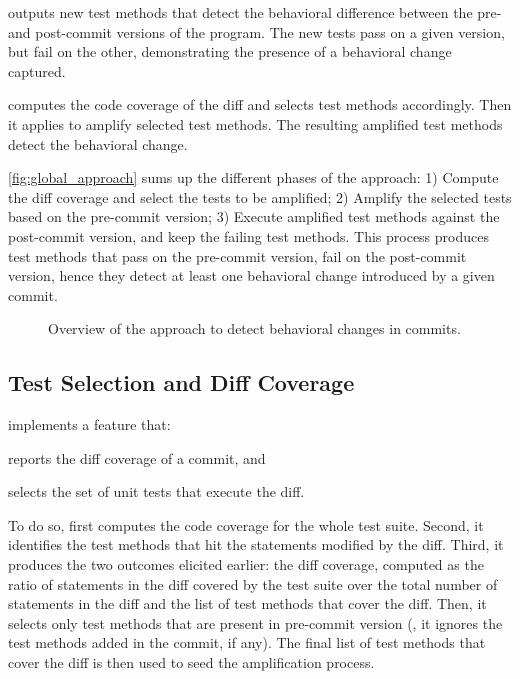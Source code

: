 \DCI outputs new test methods that detect the behavioral difference between the pre- and post-commit versions of the program.
The new tests pass on a given version, but fail on the other, demonstrating the presence of a behavioral change captured.

\DCI computes the code coverage of the diff and selects test methods accordingly.
Then it applies \dspot to amplify selected test methods.
The resulting amplified test methods detect the behavioral change.

\autoref{fig:global_approach} sums up the different phases of the approach:
1) Compute the diff coverage and select the tests to be amplified;
2) Amplify the selected tests based on the pre-commit version;
3) Execute amplified test methods against the post-commit version, and keep the failing test methods.
This process produces test methods that pass on the pre-commit version, fail on the post-commit version, hence they detect at least one behavioral change introduced by a given commit.

\begin{figure}
    \caption{Overview of the approach to detect behavioral changes in commits.}
	\label{fig:global_approach}
\end{figure}

\subsection{Test Selection and Diff Coverage}
\label{subsec:compute_diff_coverage}
\DCI implements a feature that:
\begin{enumerate*}
\item reports the diff coverage of a commit, and
\item selects the set of unit tests that execute the diff.
\end{enumerate*}
%
To do so, \DCI first computes the code coverage for the whole test suite.
Second, it identifies the test methods that hit the statements modified by the diff. 
Third, it produces the two outcomes elicited earlier: the diff coverage, computed as the ratio of statements in the diff covered by the test suite over the total number of statements in the diff and the list of test methods that cover the diff.
%
Then, it selects only test methods that are present in pre-commit version (\ie, it ignores the test methods added in the commit, if any).
The final list of test methods that cover the diff is then used to seed the amplification process.

